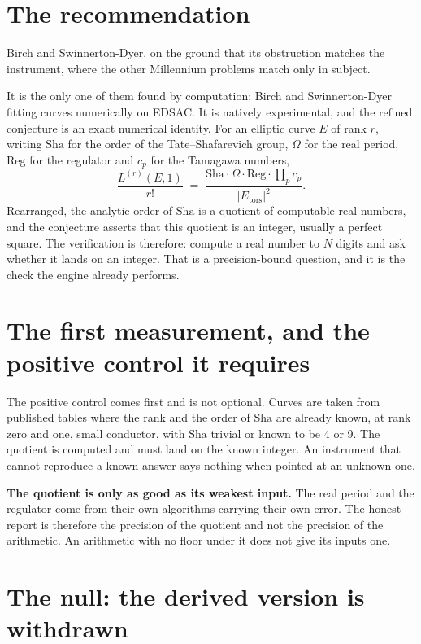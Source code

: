 \section{The recommendation}

Birch and Swinnerton-Dyer, on the ground that its obstruction matches the instrument, where the
other Millennium problems match only in subject.

It is the only one of them found by computation: Birch and Swinnerton-Dyer fitting curves
numerically on EDSAC. It is natively experimental, and the refined conjecture is an exact numerical
identity. For an elliptic curve $E$ of rank $r$, writing $\mathrm{Sha}$ for the order of the
Tate--Shafarevich group, $\Omega$ for the real period, $\mathrm{Reg}$ for the regulator and $c_p$
for the Tamagawa numbers,
\[
  \frac{L^{(r)}(E,1)}{r!} \;=\; \frac{\mathrm{Sha}\cdot\Omega\cdot\mathrm{Reg}\cdot\prod_p c_p}
                                    {|E_{\mathrm{tors}}|^2}.
\]
Rearranged, the analytic order of $\mathrm{Sha}$ is a quotient of computable real numbers, and the
conjecture asserts that this quotient is an integer, usually a perfect square. The verification is
therefore: compute a real number to $N$ digits and ask whether it lands on an integer. That is a
precision-bound question, and it is the check the engine already performs.

\section{The first measurement, and the positive control it requires}

The positive control comes first and is not optional. Curves are taken from published tables where
the rank and the order of $\mathrm{Sha}$ are already known, at rank zero and one, small conductor,
with $\mathrm{Sha}$ trivial or known to be 4 or 9. The quotient is computed and must land on the
known integer. An instrument that cannot reproduce a known answer says nothing when pointed at an
unknown one.

\textbf{The quotient is only as good as its weakest input.} The real period and the regulator come
from their own algorithms carrying their own error. The honest report is therefore the precision of
the quotient and not the precision of the arithmetic. An arithmetic with no floor under it does not
give its inputs one.

\section{The null: the derived version is withdrawn}

